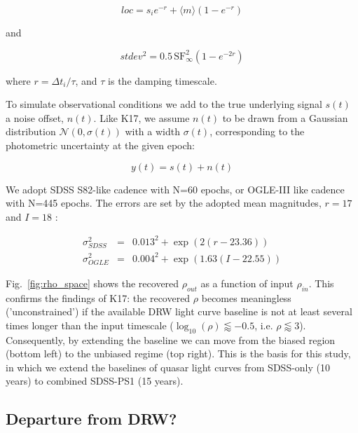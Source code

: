 \documentclass[twocolumn]{aastex62}
\begin{document}
\begin{equation}
loc = s_{i} e ^ { - r  }  + \langle m \rangle \left( 1 - e ^{ - r }\right)
\end{equation}

and 

\begin{equation}
stdev^{2} =  0.5  \, \mathrm{SF}_{\infty}^{2} \left( 1 - e ^{  - 2 r  }  \right)
\end{equation}

where  $r = \Delta t_{i} / \tau$, and $\tau$ is the damping timescale.


To simulate observational conditions  we add to the true underlying signal  $s(t)$ a noise offset, $n(t)$.  Like K17,  we assume $n(t)$ to be drawn from a Gaussian distribution $\mathcal{N}(0,\sigma(t))$ with a width $\sigma(t)$, corresponding to the  photometric uncertainty at the given epoch: 

\begin{equation}
y(t) = s(t) + n(t) 
\end{equation}



We adopt SDSS S82-like cadence with N=60 epochs, or OGLE-III like cadence with N=445 epochs.  The errors are set by the adopted mean magnitudes, $r=17$ and $I=18$ :

\begin{eqnarray}
\sigma_{SDSS}^{2} &=& 0.013^{2} + \exp{(2 (r-23.36))} \\
\sigma_{OGLE}^{2} &=& 0.004^{2} + \exp{(1.63 (I - 22.55))}
\end{eqnarray}



Fig.~\ref{fig:rho_space} shows the recovered $\rho_{out}$ as a function of input $\rho_{in}$. This confirms the findings of K17: the recovered $\rho$ becomes meaningless ('unconstrained') if the available DRW light curve baseline is not at least several times longer than the input timescale ($\log_{10}{(\rho)} \lessapprox -0.5$, i.e. $\rho \lessapprox 3 $). Consequently, by extending the baseline we can move from the biased region (bottom left) to the unbiased regime (top right). This is the basis for this study,  in which we extend the baselines of quasar light curves from SDSS-only (10 years) to combined SDSS-PS1 (15 years). 

\subsection{Departure from DRW?}
\end{document}
